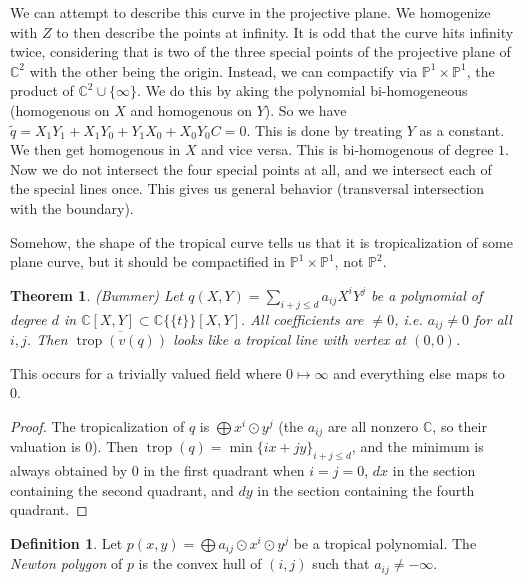 \documentclass[12pt]{memoir}
\newtheorem{prototheorem}{Theorem}[section]
\newenvironment{theorem}
   {\begin{prototheorem}}
   {\end{prototheorem}}
\theoremstyle{definition}
\newtheorem{protodefinition}{Definition}[section]
\newenvironment{define}
   {\begin{protodefinition}}
   {\end{protodefinition}}
\def\CC{{\mathbb C}}
\def\PP{{\mathbb P}}
\DeclareMathOperator{\trop}{trop}
\begin{document}
We can attempt to describe this curve in the projective plane. We homogenize with $Z$ to then describe the points at infinity. It is odd that the curve hits infinity twice, considering that is two of the three special points of the projective plane of $\CC^2$ with the other being the origin. Instead, we can compactify via $\PP^1\times \PP^1$, the product of $\CC^2\cup \{\infty\}$. We do this by aking the polynomial bi-homogeneous (homogenous on $X$ and homogenous on $Y$). So we have $\tilde{q} = X_1Y_1 +X_1Y_0+Y_1X_0 + X_0Y_0C = 0$. This is done by treating $Y$ as a constant. We then get homogenous in $X$ and vice versa. This is bi-homogenous of degree $1$. Now we do not intersect the four special points at all, and we intersect each of the special lines once. This gives us general behavior (transversal intersection with the boundary).

Somehow, the shape of the tropical curve tells us that it is tropicalization of some plane curve, but it should be compactified in $\PP^1\times \PP^1$, not $\PP^2$.





\begin{theorem}{(Bummer)}
    Let $q(X,Y)= \sum\limits_{i+j\leq d}a_{ij}X^iY^j$ be a polynomial of degree $d$ in $\CC[X,Y] \subset \CC\{\{t\}\} [X,Y]$. All coefficients are $\neq 0$, i.e. $a_{ij} \neq 0$ for all $i,j$. Then $\overline{\trop(v(q))}$ looks like a tropical line with vertex at $(0,0)$. 
\end{theorem}

This occurs for a trivially valued field where $0 \mapsto \infty$ and everything else maps to $0$.


\begin{proof}
    The tropicalization of $q$ is $\bigoplus x^i\odot y^j$ (the $a_{ij}$ are all nonzero $\CC$, so their valuation is $0$). Then $\trop(q) = \min\{ix+jy\}_{i+j\leq d}$, and the minimum is always obtained by $0$ in the first quadrant when $i=j=0$, $dx$ in the section containing the second quadrant, and $dy$ in the section containing the fourth quadrant.
\end{proof}



\begin{define}
    Let $p(x,y) = \bigoplus a_{ij} \odot x^i\odot y^j$ be a tropical polynomial. The \emph{Newton polygon} of $p$ is the convex hull of $(i,j)$ such that $a_{ij} \neq - \infty$.
\end{define}
\end{document}

